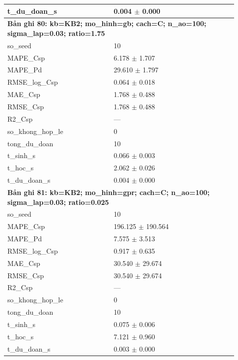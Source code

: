 \begin{longtable}{p{0.43\linewidth}p{0.50\linewidth}}
t\_\allowbreak du\_\allowbreak doan\_\allowbreak s & 0.004 $\pm$ 0.000 \\
\midrule
\multicolumn{2}{p{0.95\linewidth}}{\textbf{Bản ghi 80: kb=KB2; mo\_hinh=gb; cach=C; n\_ao=100; sigma\_lap=0.03; ratio=1.75}} \\
so\_\allowbreak seed & 10 \\
MAPE\_\allowbreak Csp & 6.178 $\pm$ 1.707 \\
MAPE\_\allowbreak Pd & 29.610 $\pm$ 1.797 \\
RMSE\_\allowbreak log\_\allowbreak Csp & 0.064 $\pm$ 0.018 \\
MAE\_\allowbreak Csp & 1.768 $\pm$ 0.488 \\
RMSE\_\allowbreak Csp & 1.768 $\pm$ 0.488 \\
R2\_\allowbreak Csp & — \\
so\_\allowbreak khong\_\allowbreak hop\_\allowbreak le & 0 \\
tong\_\allowbreak du\_\allowbreak doan & 10 \\
t\_\allowbreak sinh\_\allowbreak s & 0.066 $\pm$ 0.003 \\
t\_\allowbreak hoc\_\allowbreak s & 2.062 $\pm$ 0.026 \\
t\_\allowbreak du\_\allowbreak doan\_\allowbreak s & 0.004 $\pm$ 0.000 \\
\midrule
\multicolumn{2}{p{0.95\linewidth}}{\textbf{Bản ghi 81: kb=KB2; mo\_hinh=gpr; cach=C; n\_ao=100; sigma\_lap=0.03; ratio=0.025}} \\
so\_\allowbreak seed & 10 \\
MAPE\_\allowbreak Csp & 196.125 $\pm$ 190.564 \\
MAPE\_\allowbreak Pd & 7.575 $\pm$ 3.513 \\
RMSE\_\allowbreak log\_\allowbreak Csp & 0.917 $\pm$ 0.635 \\
MAE\_\allowbreak Csp & 30.540 $\pm$ 29.674 \\
RMSE\_\allowbreak Csp & 30.540 $\pm$ 29.674 \\
R2\_\allowbreak Csp & — \\
so\_\allowbreak khong\_\allowbreak hop\_\allowbreak le & 0 \\
tong\_\allowbreak du\_\allowbreak doan & 10 \\
t\_\allowbreak sinh\_\allowbreak s & 0.075 $\pm$ 0.006 \\
t\_\allowbreak hoc\_\allowbreak s & 7.121 $\pm$ 0.960 \\
t\_\allowbreak du\_\allowbreak doan\_\allowbreak s & 0.003 $\pm$ 0.000 \\

\end{longtable}
